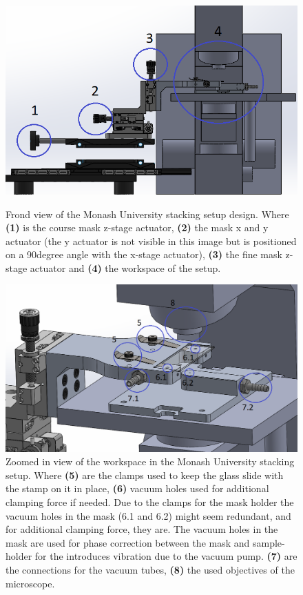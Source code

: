\documentclass[10pt]{article}
\begin{document}
\begin{figure}[H]
  \centering
  \begin{minipage}[b]{0.45\textwidth}
    \includegraphics[width=\textwidth]{img/design_cycle/monash_frond_view_with_markings.png}
    \caption{Frond view of the Monash University stacking setup design. Where \textbf{(1)} is the course mask z-stage actuator, \textbf{(2)} the mask x and y actuator (the y actuator is not visible in this image but is positioned on a 90degree angle with the x-stage actuator), \textbf{(3)} the fine mask z-stage actuator and \textbf{(4)} the workspace of the setup.}
    \label{fig:monash_frond}
  \end{minipage}
  \hfill
  \begin{minipage}[b]{0.53\textwidth}
    \includegraphics[width=\textwidth]{img/design_cycle/monash_workspace_with_markings.png}
    \caption{Zoomed in view of the workspace in the Monash University stacking setup. Where \textbf{(5)} are the clamps used to keep the glass slide with the stamp on it in place, \textbf{(6)} vacuum holes used for additional clamping force if needed. Due to the clamps for the mask holder the vacuum holes in the mask (6.1 and 6.2) might seem redundant, and for additional clamping force, they are. The vacuum holes in the mask are used for phase correction between the mask and sample-holder for the introduces vibration due to the vacuum pump. \textbf{(7)} are the connections for the vacuum tubes, \textbf{(8)} the used objectives of the microscope.}
    \label{fig:monash_side}
  \end{minipage}
\end{figure}
\end{document}
